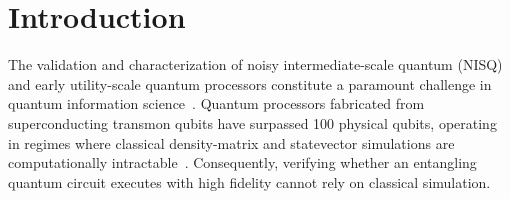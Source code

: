 \documentclass[aps,pra,reprint,superscriptaddress,floatfix,nofootinbib]{revtex4-2}
\begin{document}
\begin{abstract}
$n = 4$ to $64$ qubits reveals a fundamental physical crossover from $T_1$-dominated excitation loss ($\langle \hat{N} \rangle < 2$, $R_{\text{asym}} > 1$) at $n = 4$ to extensive spectator-qubit readout dark-count gain ($\langle \hat{N} \rangle > 2$, $R_{\text{asym}} < 1$) at $n \ge 8$, preserves $24.79\% \pm 0.48\%$ raw full-register VQE confinement at $n = 64$ on \texttt{ibm\_kingston} while restoring $87.29\% \pm 0.37\%$ ($F_{\text{echo}}^{\text{act}} = 78.78\% \pm 0.45\%$) on \texttt{ibm\_kingston} and $82.85\% \pm 0.42\%$ ($F_{\text{echo}}^{\text{act}} = 70.95\% \pm 0.50\%$) on \texttt{ibm\_fez} via in situ spectator-readout deconvolution without external calibration circuits, and isolates localized hardware defects ($n = 12$ on \texttt{ibm\_fez} vs.\ $n = 32$ on \texttt{ibm\_kingston}) as well as asynchronous cloud-queue calibration drift---entirely without classical tensor simulation ($O(1)$ analytical reference complexity with linear $O(S \cdot n)$ bitstring post-processing).
\end{abstract}

\maketitle

\section{Introduction}

The validation and characterization of noisy intermediate-scale quantum (NISQ) and early utility-scale quantum processors constitute a paramount challenge in quantum information science~\cite{Preskill2018, Cerezo2021}. Quantum processors fabricated from superconducting transmon qubits have surpassed 100 physical qubits, operating in regimes where classical density-matrix and statevector simulations are computationally intractable~\cite{Kim2023}. Consequently, verifying whether an entangling quantum circuit executes with high fidelity cannot rely on classical simulation.
\end{document}
